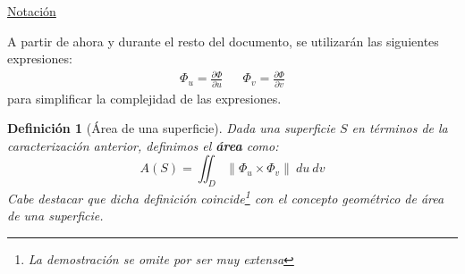 \documentclass[10pt,a4paper,openright]{book}
\theoremstyle{break}
\newtheorem*{defi}{Definición}
\newcommand{\dif}[1]{\ d#1}
\begin{document}
\underline{Notación}

A partir de ahora y durante el resto del documento, se utilizarán las siguientes expresiones:
\begin{align*}
\Phi_u = \frac{\partial \Phi}{\partial u} & & \Phi_v = \frac{\partial \Phi}{\partial v}
\end{align*}
para simplificar la complejidad de las expresiones.

\begin{defi}[Área de una superficie]
Dada una superficie $S$ en términos de la caracterización anterior, definimos el \textbf{área} como: 
$$A\left( S \right) = \iint_{D} \lVert \Phi_{u} \times \Phi_v \rVert \dif{u} \dif{v}$$
Cabe destacar que dicha definición coincide\footnote{La demostración se omite por ser muy extensa} con el concepto geométrico de área de una superficie.
\end{defi}
\end{document}

